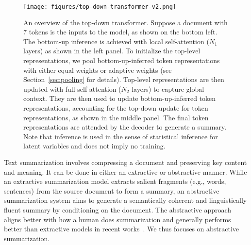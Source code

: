 \documentclass{article} \usepackage{iclr2022_conference,times}
\begin{document}
\begin{figure}
    \centering
    \texttt{[image: figures/top-down-transformer-v2.png]}
    \caption{\footnotesize An overview of the top-down transformer. Suppose a document with 7 tokens is the inputs to the model, as shown on the bottom left. The bottom-up inference is achieved with local self-attention ($N_1$ layers) as shown in the left panel. To initialize the top-level representations, we pool bottom-up-inferred token representations with either equal weights or adaptive weights (see Section~\ref{sec:pooling} for details). Top-level representations are then updated with full self-attention ($N_2$ layers) to capture global context. They are then used to update bottom-up-inferred token representations, accounting for the top-down update for token representations, as shown in the middle panel. The final token representations are attended by the decoder to generate a summary. Note that inference is used in the sense of statistical inference for latent variables and does not imply no training. }
    \label{fig:top-down-transformer}
\end{figure}


Text summarization involves compressing a document and preserving key content and meaning. It can be done in either an extractive or abstractive manner. While an extractive summarization model extracts salient fragments (e.g., words, sentences) from the source document to form a summary, an abstractive summarization system aims to generate a semantically coherent and linguistically fluent summary by conditioning on the document. The abstractive approach aligns better with how a human does summarization and generally performs better than extractive models in recent works~\citep{pilault-etal-2020-extractive, zhang2020pegasus}. We thus focuses on abstractive summarization.
\end{document}
